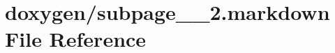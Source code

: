 \hypertarget{subpage__1__2_8markdown}{}\section{doxygen/subpage\+\_\+\_\+2.markdown File Reference}
\label{subpage__1__2_8markdown}
